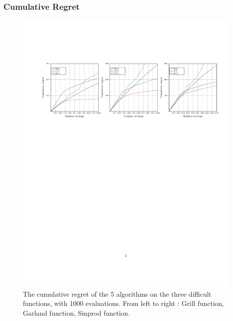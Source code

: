\documentclass[xcolor={usenames,dvipsnames}]{beamer}
\begin{document}
\begin{frame}
\frametitle{Cumulative Regret}
\vfill
\begin{figure}
	\includegraphics[trim={2cm 6cm 0 4cm},clip,scale = 0.65]{cumulative1000.pdf}
\vspace{-7.25cm}
\caption{\label{fig:cumulative1000}The cumulative regret of the 5 algorithms on the three difficult functions, with 1000 evaluations. From left to right : Grill function, Garland function, Sinprod function.}
\end{figure}
\end{frame}
\end{document}
